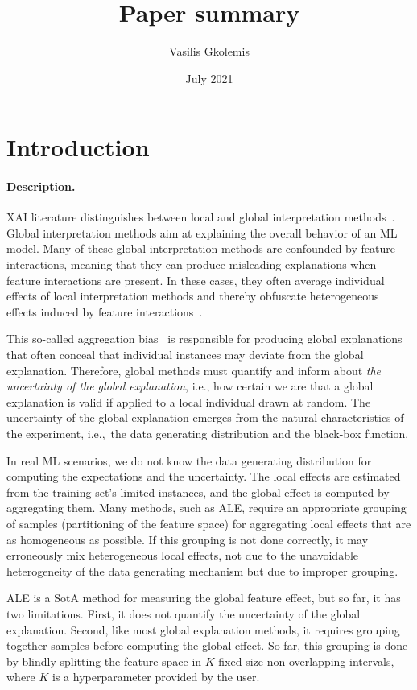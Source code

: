\documentclass{article}
\title{Paper summary}
\author{Vasilis Gkolemis}
\date{July 2021}
\begin{document}
\maketitle

\section{Introduction}
\label{sec:introduction}

\paragraph{Description.}

XAI literature distinguishes between local and global interpretation methods~\cite{Molnar2020}.
Global interpretation methods aim at explaining the overall behavior of an ML model.
Many of these global interpretation methods are confounded by feature interactions,
meaning that they can produce misleading explanations when feature interactions are present.
In these cases, they often average individual effects of local interpretation methods and thereby obfuscate heterogeneous effects induced by feature interactions~\cite{Herbinger2022}.

This so-called aggregation bias~\cite{Mehrabi2019} is responsible for producing global explanations that often conceal that individual instances may deviate from the global explanation.
Therefore, global methods must quantify and inform about \textit{the uncertainty of the global explanation}, i.e., how certain we are that a global explanation is valid if applied to a local individual drawn at random.
The uncertainty of the global explanation emerges from the natural characteristics of the experiment, i.e.,~the data generating distribution and the black-box function.

In real ML scenarios, we do not know the data generating distribution for computing the expectations and the uncertainty.
The local effects are estimated from the training set's limited instances, and the global effect is computed by aggregating them.
Many methods, such as ALE, require an appropriate grouping of samples (partitioning of the feature space) for aggregating local effects that are as homogeneous as possible.
If this grouping is not done correctly, it may erroneously mix heterogeneous local effects, not due to the unavoidable heterogeneity of the data generating mechanism but due to improper grouping.

ALE is a SotA method for measuring the global feature effect, but so far, it has two limitations.
First, it does not quantify the uncertainty of the global explanation.
Second, like most global explanation methods, it requires grouping together samples before computing the global effect.
So far, this grouping is done by blindly splitting the feature space in \(K\) fixed-size non-overlapping intervals, where \(K\) is a hyperparameter provided by the user.
\end{document}
